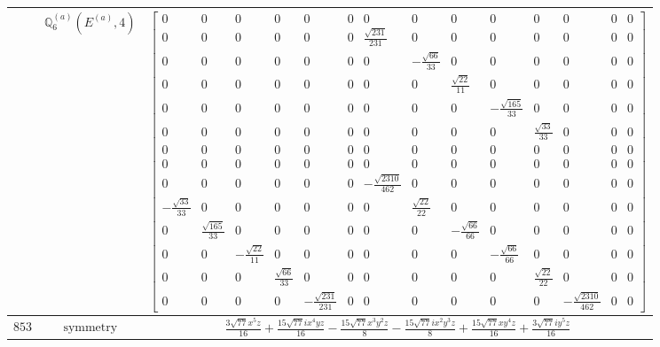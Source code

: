 \documentclass[fleqn,8pt,landscape]{jsarticle}
\begin{document}
\begin{longtable}{ccc}
$  $ & $ \mathbb{Q}_{6}^{(a)}(E^{(a)},4) $ & $ \begin{bmatrix} 0 & 0 & 0 & 0 & 0 & 0 & 0 & 0 & 0 & 0 & 0 & 0 & 0 & 0 \\ 0 & 0 & 0 & 0 & 0 & 0 & \frac{\sqrt{231}}{231} & 0 & 0 & 0 & 0 & 0 & 0 & 0 \\ 0 & 0 & 0 & 0 & 0 & 0 & 0 & - \frac{\sqrt{66}}{33} & 0 & 0 & 0 & 0 & 0 & 0 \\ 0 & 0 & 0 & 0 & 0 & 0 & 0 & 0 & \frac{\sqrt{22}}{11} & 0 & 0 & 0 & 0 & 0 \\ 0 & 0 & 0 & 0 & 0 & 0 & 0 & 0 & 0 & - \frac{\sqrt{165}}{33} & 0 & 0 & 0 & 0 \\ 0 & 0 & 0 & 0 & 0 & 0 & 0 & 0 & 0 & 0 & \frac{\sqrt{33}}{33} & 0 & 0 & 0 \\ 0 & 0 & 0 & 0 & 0 & 0 & 0 & 0 & 0 & 0 & 0 & 0 & 0 & 0 \\ 0 & 0 & 0 & 0 & 0 & 0 & 0 & 0 & 0 & 0 & 0 & 0 & 0 & 0 \\ 0 & 0 & 0 & 0 & 0 & 0 & - \frac{\sqrt{2310}}{462} & 0 & 0 & 0 & 0 & 0 & 0 & 0 \\ - \frac{\sqrt{33}}{33} & 0 & 0 & 0 & 0 & 0 & 0 & \frac{\sqrt{22}}{22} & 0 & 0 & 0 & 0 & 0 & 0 \\ 0 & \frac{\sqrt{165}}{33} & 0 & 0 & 0 & 0 & 0 & 0 & - \frac{\sqrt{66}}{66} & 0 & 0 & 0 & 0 & 0 \\ 0 & 0 & - \frac{\sqrt{22}}{11} & 0 & 0 & 0 & 0 & 0 & 0 & - \frac{\sqrt{66}}{66} & 0 & 0 & 0 & 0 \\ 0 & 0 & 0 & \frac{\sqrt{66}}{33} & 0 & 0 & 0 & 0 & 0 & 0 & \frac{\sqrt{22}}{22} & 0 & 0 & 0 \\ 0 & 0 & 0 & 0 & - \frac{\sqrt{231}}{231} & 0 & 0 & 0 & 0 & 0 & 0 & - \frac{\sqrt{2310}}{462} & 0 & 0 \end{bmatrix} $ \\ \hline
$ 853 $ & $ \text{symmetry} $ & $ \frac{3 \sqrt{77} x^{5} z}{16} + \frac{15 \sqrt{77} i x^{4} y z}{16} - \frac{15 \sqrt{77} x^{3} y^{2} z}{8} - \frac{15 \sqrt{77} i x^{2} y^{3} z}{8} + \frac{15 \sqrt{77} x y^{4} z}{16} + \frac{3 \sqrt{77} i y^{5} z}{16} $ \\

\end{longtable}
\end{document}
